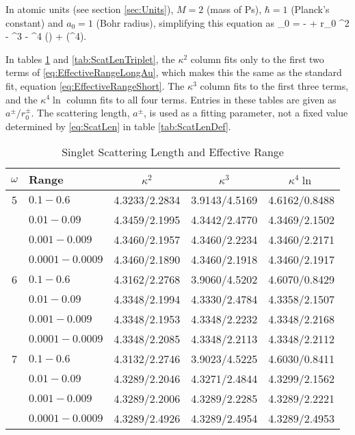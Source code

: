 \documentclass[Dissertation.tex]{subfiles}
\begin{document}
\noindent In atomic units (see section \ref{sec:Units}), $M = 2$ (mass of Ps), $\hbar = 1$ (Planck's constant) and $a_0 = 1$ (Bohr radius), simplifying this equation as
\beq
\label{eq:EffectiveRangeLongAu}
\kappa \cot\eta_0 = - +  r_0 \kappa^2 -  \kappa^3 -  \kappa^4 \ln \left(\kappa \right) + (\kappa^4).
\eeq

In tables \ref{tab:ScatLenSinglet} and \ref{tab:ScatLenTriplet}, the $\kappa^2$ column fits only to the first two terms of \ref{eq:EffectiveRangeLongAu}, which makes this the same as the standard fit, equation \ref{eq:EffectiveRangeShort}.  The $\kappa^3$ column fits to the first three terms, and the $\kappa^4 \ln$ column fits to all four terms.  Entries in these tables are given as $a^\pm / r_0^\pm$. The scattering length, $a^\pm$, is used as a fitting parameter, not a fixed value determined by \ref{eq:ScatLen} in table \ref{tab:ScatLenDef}.


\begin{table}[H]
\centering
\begin{tabular}{c l c c c}
\toprule
$\omega$ & Range & $\kappa^2$ & $\kappa^3$ & $\kappa^4 \ln$ \\
\midrule
5 & $0.1 - 0.6$ & 4.3233/2.2834 & 3.9143/4.5169 & 4.6162/0.8488 \\
  & $0.01 - 0.09$ & 4.3459/2.1995 & 4.3442/2.4770 & 4.3469/2.1502 \\
  & $0.001 - 0.009$ & 4.3460/2.1957 & 4.3460/2.2234 & 4.3460/2.2171 \\
  & $0.0001 - 0.0009$ & 4.3460/2.1890 & 4.3460/2.1918 & 4.3460/2.1917 \\
\midrule
6 & $0.1 - 0.6$ & 4.3162/2.2768 & 3.9060/4.5202 & 4.6070/0.8429 \\
  & $0.01 - 0.09$ & 4.3348/2.1994 & 4.3330/2.4784 & 4.3358/2.1507 \\
  & $0.001 - 0.009$ & 4.3348/2.1953 & 4.3348/2.2232 & 4.3348/2.2168 \\
  & $0.0001 - 0.0009$ & 4.3348/2.2085 & 4.3348/2.2113 & 4.3348/2.2112 \\
\midrule
7 & $0.1 - 0.6$ & 4.3132/2.2746 & 3.9023/4.5225 & 4.6030/0.8411 \\
  & $0.01 - 0.09$ & 4.3289/2.2046 & 4.3271/2.4844 & 4.3299/2.1562 \\
  & $0.001 - 0.009$ & 4.3289/2.2006 & 4.3289/2.2285 & 4.3289/2.2221 \\
  & $0.0001 - 0.0009$ & 4.3289/2.4926 & 4.3289/2.4954 & 4.3289/2.4953 \\
\bottomrule
\end{tabular}
\caption{Singlet Scattering Length and Effective Range}
\label{tab:ScatLenSinglet}
\end{table}
\end{document}
